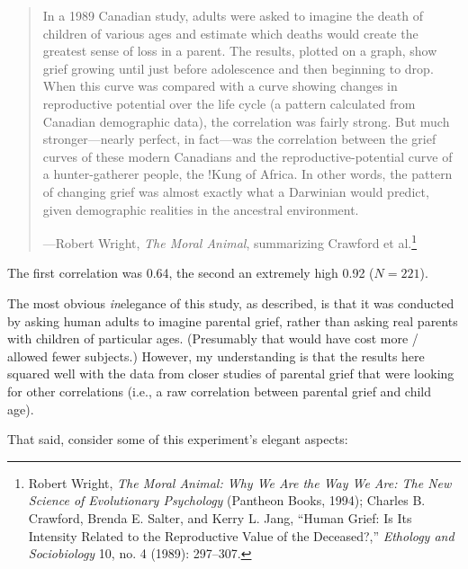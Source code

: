 \begin{quote}
{
 In a 1989 Canadian study, adults were asked to imagine the death
of children of various ages and estimate which deaths would create the
greatest sense of loss in a parent. The results, plotted on a graph,
show grief growing until just before adolescence and then beginning to
drop. When this curve was compared with a curve showing changes in
reproductive potential over the life cycle (a pattern calculated from
Canadian demographic data), the correlation was fairly strong. But much
stronger---nearly perfect, in fact---was the correlation between the
grief curves of these modern Canadians and the reproductive-potential
curve of a hunter-gatherer people, the !Kung of Africa. In other words,
the pattern of changing grief was almost exactly what a Darwinian would
predict, given demographic realities in the ancestral environment.}

{\raggedleft
 {}---Robert Wright, \textit{The Moral Animal},\newline
 summarizing Crawford et al.\footnote{Robert Wright, \textit{The Moral Animal: Why We Are the Way We
Are: The New Science of Evolutionary Psychology} (Pantheon Books,
1994); Charles B. Crawford, Brenda E. Salter, and Kerry L. Jang,
``Human Grief: Is Its Intensity Related to the
Reproductive Value of the Deceased?,''
\textit{Ethology and Sociobiology} 10, no. 4 (1989): 297--307.}
\par}
\end{quote}


{
 The first correlation was 0.64, the second an extremely high 0.92
($N = 221$).}

{
 The most obvious \textit{in}elegance of this study, as described,
is that it was conducted by asking human adults to imagine parental
grief, rather than asking real parents with children of particular
ages. (Presumably that would have cost more / allowed fewer subjects.)
However, my understanding is that the results here squared well with
the data from closer studies of parental grief that were looking for
other correlations (i.e., a raw correlation between parental grief and
child age).}

{
 That said, consider some of this experiment's
elegant aspects:}

